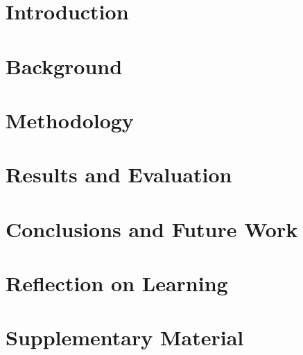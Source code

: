 \chapter{Introduction}\label{ch1}


\chapter{Background}\label{ch2}


\chapter{Methodology}\label{ch3}


\chapter{Results and Evaluation}\label{ch4}


\chapter{Conclusions and Future Work}\label{ch5}


\chapter{Reflection on Learning}\label{ch6}


\backmatter

\appendix
\chapter{Supplementary Material}\label{app:supp}


% 



